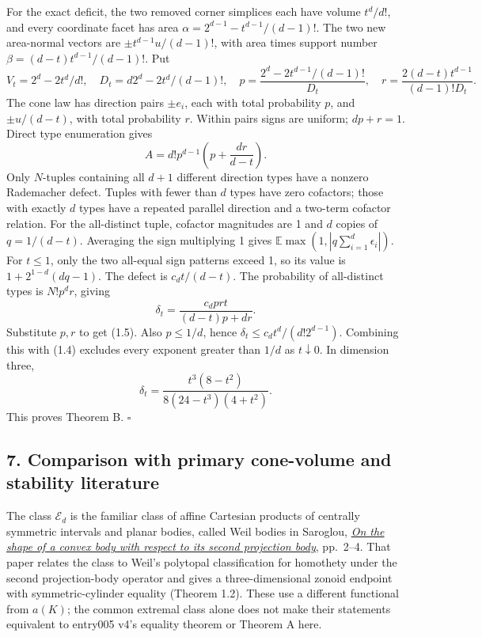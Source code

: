 \documentclass[
  11pt,
]{article}
\begin{document}
For the exact deficit, the two removed corner simplices each have volume
\(t^d/d!\), and every coordinate facet has area
\(\alpha=2^{d-1}-t^{d-1}/(d-1)!\). The two new area-normal vectors are
\(\pm t^{d-1}u/(d-1)!\), with area times support number
\(\beta=(d-t)t^{d-1}/(d-1)!\). Put \[
 V_t=2^d-2t^d/d!,\quad D_t=d2^d-2t^d/(d-1)!,\quad
 p=\frac{2^d-2t^{d-1}/(d-1)!}{D_t},\quad
 r=\frac{2(d-t)t^{d-1}}{(d-1)!D_t}.
\] The cone law has direction pairs \(\pm e_i\), each with total
probability \(p\), and \(\pm u/(d-t)\), with total probability \(r\).
Within pairs signs are uniform; \(dp+r=1\). Direct type enumeration
gives \[
 A=d!p^{d-1}\left(p+\frac{dr}{d-t}\right).
\] Only \(N\)-tuples containing all \(d+1\) different direction types
have a nonzero Rademacher defect. Tuples with fewer than \(d\) types
have zero cofactors; those with exactly \(d\) types have a repeated
parallel direction and a two-term cofactor relation. For the
all-distinct tuple, cofactor magnitudes are 1 and \(d\) copies of
\(q=1/(d-t)\). Averaging the sign multiplying 1 gives
\(\mathbb E\max(1,|q\sum_{i=1}^d\epsilon_i|)\). For \(t\le1\), only the
two all-equal sign patterns exceed 1, so its value is
\(1+2^{1-d}(dq-1)\). The defect is \(c_dt/(d-t)\). The probability of
all-distinct types is \(N!p^dr\), giving \[
 \delta_t=\frac{c_dprt}{(d-t)p+dr}.
\] Substitute \(p,r\) to get (1.5). Also \(p\le1/d\), hence
\(\delta_t\le c_dt^d/(d!2^{d-1})\). Combining this with (1.4) excludes
every exponent greater than \(1/d\) as \(t\downarrow0\). In dimension
three, \[
 \delta_t=\frac{t^3(8-t^2)}{8(24-t^3)(4+t^2)}.
\] This proves Theorem B. \(\square\)

\subsection{7. Comparison with primary cone-volume and stability
literature}\label{comparison-with-primary-cone-volume-and-stability-literature}

The class \(\mathcal E_d\) is the familiar class of affine Cartesian
products of centrally symmetric intervals and planar bodies, called Weil
bodies in Saroglou, \href{https://arxiv.org/pdf/1409.4347v2}{\emph{On
the shape of a convex body with respect to its second projection body}},
pp.~2--4. That paper relates the class to Weil's polytopal
classification for homothety under the second projection-body operator
and gives a three-dimensional zonoid endpoint with symmetric-cylinder
equality (Theorem 1.2). These use a different functional from \(a(K)\);
the common extremal class alone does not make their statements
equivalent to entry005 v4's equality theorem or Theorem A here.
\end{document}
